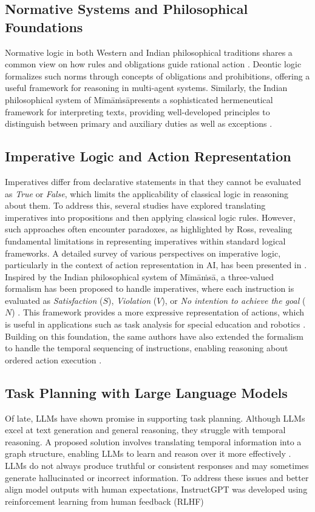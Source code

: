 \documentclass[a4paper,11pt]{lmcs}
\newcommand{\mimamsa}{M\={i}m\={a}\.ms\={a}}
\begin{document}
\subsection*{Normative Systems and Philosophical Foundations}
Normative logic in both Western and Indian philosophical traditions shares a common view on how rules and obligations guide rational action \citep{sanyal}. Deontic logic formalizes such norms through concepts of obligations and prohibitions, offering a useful framework for reasoning in multi-agent systems. Similarly, the Indian philosophical system of \mimamsa presents a sophisticated hermeneutical framework for interpreting texts, providing well-developed principles to distinguish between primary and auxiliary duties as well as exceptions \citep{davis}.

\subsection*{Imperative Logic and Action Representation}
Imperatives differ from declarative statements in that they cannot be evaluated as \textit{True} or \textit{False}, which limits the applicability of classical logic in reasoning about them. To address this, several studies have explored translating imperatives into propositions and then applying classical logic rules. However, such approaches often encounter paradoxes, as highlighted by Ross, revealing fundamental limitations in representing imperatives within standard logical frameworks. A detailed survey of various perspectives on imperative logic, particularly in the context of action representation in AI, has been presented in \citep{survey}. Inspired by the Indian philosophical system of \mimamsa, a three-valued formalism has been proposed to handle imperatives, where each instruction is evaluated as \textit{Satisfaction} ($S$), \textit{Violation} ($V$), or \textit{No intention to achieve the goal} ($N$) \citep{mira}. This framework provides a more expressive representation of actions, which is useful in applications such as
 task analysis for special education \citep{ta} and robotics \citep{mira_robot}. Building on this foundation, the same authors have also extended the formalism to handle the temporal sequencing of instructions, enabling reasoning about ordered action execution \citep{llmmira}.

\subsection*{Task Planning with Large Language Models}
Of late, LLMs have shown promise in supporting task planning. Although LLMs excel at text generation and general reasoning, they struggle with temporal reasoning. A proposed solution involves translating temporal information into a graph structure, enabling LLMs to learn and reason over it more effectively \citep{xiong}. LLMs do not always produce truthful or consistent responses and may sometimes generate hallucinated or incorrect information. To address these issues and better align model outputs with human expectations, InstructGPT was developed using reinforcement learning from human feedback (RLHF) \citep{llm_human}
\end{document}
